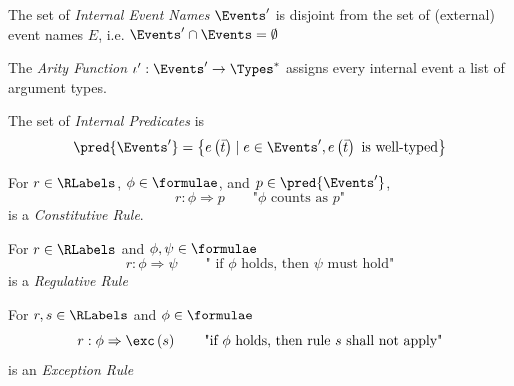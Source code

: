 \begin{definition}
    \label{def:cre-internal-events}
    The set of \emph{Internal Event Names} $\Events'$ is disjoint from
    the set of (external) event names $E$, i.e. $\Events' \cap \Events = \emptyset$
\end{definition}

\begin{definition}
    \label{def:cre-internal-arity-function}
    The \emph{Arity Function} $\iota': \Events' \to \Types^*$
    assigns every internal event a list of argument types.
\end{definition}

\begin{definition}
    \label{def:cre-internal-predicates}
    The set of \emph{Internal Predicates} is
    $$
    \pred{\Events'}
    = \left\lbrace e\left(\bar{t}\right) \mid
    e \in \Events', e\left(\bar{t}\right) \text{ is well-typed} \right\rbrace
    $$
\end{definition}

\begin{definition}
    \label{def:cre-constitutive-rule}
    For  $r \in \RLabels$, $\phi\in \formulae$,
    and $p \in \pred{\Events'}$,
    \begin{equation*}
        r: \phi \Rightarrow p \qquad \text {"} \phi \text{ counts as } p \text{"}
    \end{equation*}
    is a \emph{Constitutive Rule}.
\end{definition}

\begin{definition}
    \label{def:cre-regulative-rule}
    For $r \in \RLabels$ and $\phi, \psi \in \formulae$
    \begin{equation*}
        r: \phi \Rightarrow \psi \qquad
        \text{" if } \phi \text{ holds, then } \psi \text{ must hold"}
    \end{equation*}
    is a \emph{Regulative Rule}
\end{definition}

\begin{definition}
    \label{def:cre-exeption-rule}
    For $r,s \in \RLabels$ and $\phi \in \formulae$
    \begin{equation*}
        r: \phi \Rightarrow \exc\left(s\right)
        \qquad
        \text{"if } \phi \text{ holds, then rule } s \text{ shall not apply"}
    \end{equation*}
    is an \emph{Exception Rule}
\end{definition}

